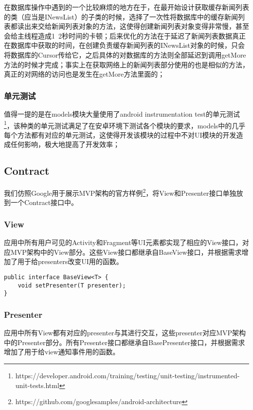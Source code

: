 \documentclass[UTF8]{ctexart}
\begin{document}
		在数据库操作中遇到的一个比较麻烦的地方在于，在最开始设计获取缓存新闻列表的类（应当是INewsList）的子类的时候，选择了一次性将数据库中的缓存新闻列表都读出来交给新闻列表对象的方法，这使得创建新闻列表对象变得非常慢，甚至会给主线程造成1~2秒时间的卡顿；后来优化的方法在于延迟了新闻列表数据真正在数据库中获取的时间，在创建负责缓存新闻列表的INewsList对象的时候，只会将数据库的Cursor传给它，之后具体的对数据库的方法则全部延迟到调用getMore方法的时候才完成；事实上在获取网络上的新闻列表部分使用的也是相似的方法，真正的对网络的访问也是发生在getMore方法里面的；
	
	\subsubsection{单元测试}
	    值得一提的是在models模块大量使用了android instrumentation test的单元测试\footnote{https://developer.android.com/training/testing/unit-testing/instrumented-unit-tests.html}，该种类的单元测试满足了在安卓环境下测试各个模块的要求，models中的几乎每个方法都有对应的单元测试，这使得开发该模块的过程中不对UI模块的开发造成任何影响，极大地提高了开发效率；

\subsection{Contract}
	我们仿照Google用于展示MVP架构的官方样例\footnote{https://github.com/googlesamples/android-architecture}，将View和Presenter接口单独放到一个Contract接口中。

	\subsubsection{View}

		应用中所有用户可见的Activity和Fragment等UI元素都实现了相应的View接口，对应MVP架构中的View部分。这些View接口都继承自BaseView接口，并根据需求增加了用于给presenters改变UI用的函数。

\begin{verbatim}
public interface BaseView<T> {
    void setPresenter(T presenter);
}
\end{verbatim}

	\subsubsection{Presenter}

		应用中所有View都有对应的presenter与其进行交互，这些presenter对应MVP架构中的Presenter部分。所有Presenter接口都继承自BasePresenter接口，并根据需求增加了用于给view通知事件用的函数。
\end{document}
